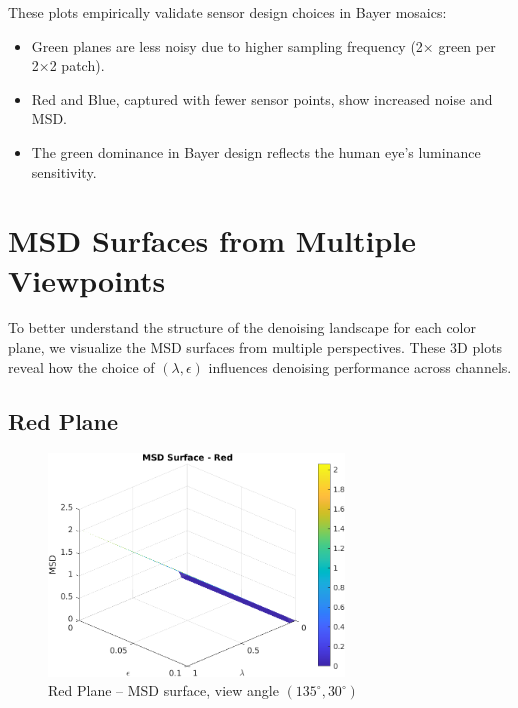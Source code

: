 \documentclass[11pt]{article}
\begin{document}
\noindent These plots empirically validate sensor design choices in Bayer mosaics:
\begin{itemize}
  \item Green planes are less noisy due to higher sampling frequency (2× green per 2×2 patch).
  \item Red and Blue, captured with fewer sensor points, show increased noise and MSD.
  \item The green dominance in Bayer design reflects the human eye's luminance sensitivity.
\end{itemize}



\section*{MSD Surfaces from Multiple Viewpoints}

To better understand the structure of the denoising landscape for each color plane, we visualize the MSD surfaces from multiple perspectives. These 3D plots reveal how the choice of $(\lambda, \epsilon)$ influences denoising performance across channels.

\subsection*{Red Plane}
\begin{figure}[h!]
\centering
\includegraphics[width=0.7\textwidth]{../utils/results/msd_surfaces/msd_surface_red_angle_135_30.png}
\caption{Red Plane – MSD surface, view angle $(135^\circ, 30^\circ)$}
\end{figure}
\clearpage
\end{document}
